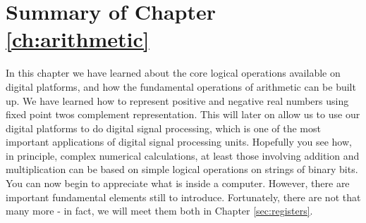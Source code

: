 \documentclass[../physical_computing.tex]{subfiles}
\begin{document}
\section{Summary of Chapter \ref{ch:arithmetic}}
\label{sec:ch1summary}

In this chapter we have learned about the core logical operations
available on digital platforms, and how the fundamental operations
of arithmetic can be built up. We have learned how to represent
positive and negative real numbers using fixed point twos
complement representation. This will later on allow us to use
our digital platforms to do digital signal processing, which is 
one of the most important applications of digital signal processing
units. Hopefully you see how, in principle, complex numerical
calculations, at least those involving addition and multiplication
can be based on simple logical operations on strings of binary 
bits. You can now begin to appreciate what is inside a computer.
However, there are important fundamental elements still to introduce.
Fortunately, there are not that many more - in fact, we will meet
them both in Chapter \ref{sec:registers}.
\end{document}
